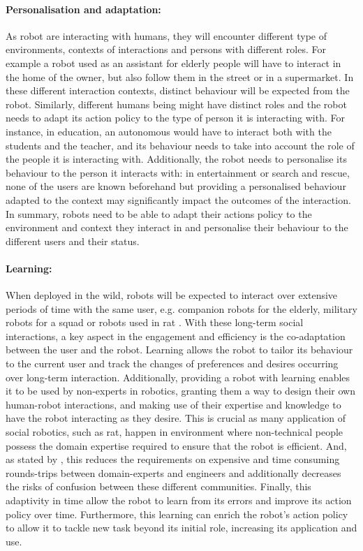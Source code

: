     \paragraph{Personalisation and adaptation: } As robot are interacting with humans, they will encounter different type of environments, contexts of interactions and persons with different roles. For example a robot used as an assistant for elderly people will have to interact in the home of the owner, but also follow them in the street or in a supermarket. In these different interaction contexts, distinct behaviour will be expected from the robot. Similarly, different humans being might have distinct roles and the robot needs to adapt its action policy to the type of person it is interacting with. For instance, in education, an autonomous would have to interact both with the students and the teacher, and its behaviour needs to take into account the role of the people it is interacting with. Additionally, the robot needs to personalise its behaviour to the person it interacts with: in entertainment or search and rescue, none of the users are known beforehand but providing a personalised behaviour adapted to the context may significantly impact the outcomes of the interaction. In summary, robots need to be able to adapt their actions policy to the environment and context they interact in and personalise their behaviour to the different users and their status.

	\paragraph{Learning:} When deployed in the wild, robots will be expected to interact over extensive periods of time with the same user, e.g. companion robots for the elderly, military robots for a squad or robots used in \gls{rat} \citep{leite2013social}. With these long-term social interactions, a key aspect in the engagement and efficiency is the co-adaptation between the user and the robot. Learning allows the robot to tailor its behaviour to the current user and track the changes of preferences and desires occurring over long-term interaction. Additionally, providing a robot with learning enables it to be used by non-experts in robotics, granting them a way to design their own human-robot interactions, and making use of their expertise and knowledge to have the robot interacting as they desire. This is crucial as many application of social robotics, such as \gls{rat}, happen in environment where non-technical people possess the domain expertise required to ensure that the robot is efficient. And, as stated by \cite{amershi2014power}, this reduces the requirements on expensive and time consuming rounds-trips between domain-experts and engineers and additionally decreases the risks of confusion between these different communities. Finally, this adaptivity in time allow the robot to learn from its errors and improve its action policy over time. Furthermore, this learning can enrich the robot's action policy to allow it to tackle new task beyond its initial role, increasing its application and use.
	
